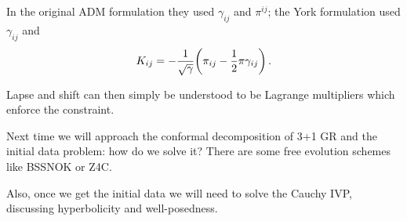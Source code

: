\documentclass[main.tex]{subfiles}
\begin{document}
In the original ADM formulation they used \(\gamma_{ij}\) and \(\pi^{ij}\); the York formulation used \(\gamma_{ij}\) and 
%
\begin{align}
K_{ij} = - \frac{1}{\sqrt{\gamma }} \qty(\pi_{ij} - \frac{1}{2} \pi \gamma_{ij})
\,.
\end{align}

Lapse and shift can then simply be understood to be Lagrange multipliers which enforce the constraint. 

Next time we will approach the conformal decomposition of 3+1 GR and the initial data problem: how do we solve it? 
There are some free evolution schemes like BSSNOK or Z4C.

Also, once we get the initial data we will need to solve the Cauchy IVP, discussing hyperbolicity and well-posedness. 
\end{document}
